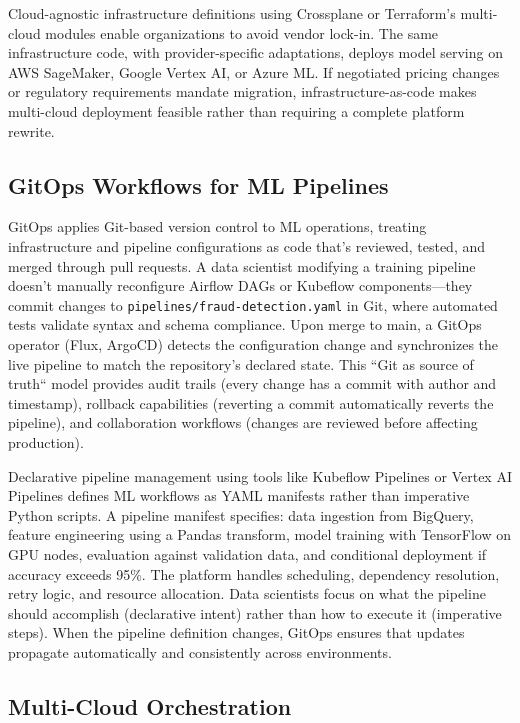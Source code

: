 Cloud-agnostic infrastructure definitions using Crossplane or Terraform's multi-cloud modules enable organizations to avoid vendor lock-in. The same infrastructure code, with provider-specific adaptations, deploys model serving on AWS SageMaker, Google Vertex AI, or Azure ML. If negotiated pricing changes or regulatory requirements mandate migration, infrastructure-as-code makes multi-cloud deployment feasible rather than requiring a complete platform rewrite.

\subsection{GitOps Workflows for ML Pipelines}

GitOps applies Git-based version control to ML operations, treating infrastructure and pipeline configurations as code that's reviewed, tested, and merged through pull requests. A data scientist modifying a training pipeline doesn't manually reconfigure Airflow DAGs or Kubeflow components---they commit changes to \texttt{pipelines/fraud-detection.yaml} in Git, where automated tests validate syntax and schema compliance. Upon merge to main, a GitOps operator (Flux, ArgoCD) detects the configuration change and synchronizes the live pipeline to match the repository's declared state. This ``Git as source of truth`` model provides audit trails (every change has a commit with author and timestamp), rollback capabilities (reverting a commit automatically reverts the pipeline), and collaboration workflows (changes are reviewed before affecting production).

Declarative pipeline management using tools like Kubeflow Pipelines or Vertex AI Pipelines defines ML workflows as YAML manifests rather than imperative Python scripts. A pipeline manifest specifies: data ingestion from BigQuery, feature engineering using a Pandas transform, model training with TensorFlow on GPU nodes, evaluation against validation data, and conditional deployment if accuracy exceeds 95\%. The platform handles scheduling, dependency resolution, retry logic, and resource allocation. Data scientists focus on what the pipeline should accomplish (declarative intent) rather than how to execute it (imperative steps). When the pipeline definition changes, GitOps ensures that updates propagate automatically and consistently across environments.

\subsection{Multi-Cloud Orchestration}

